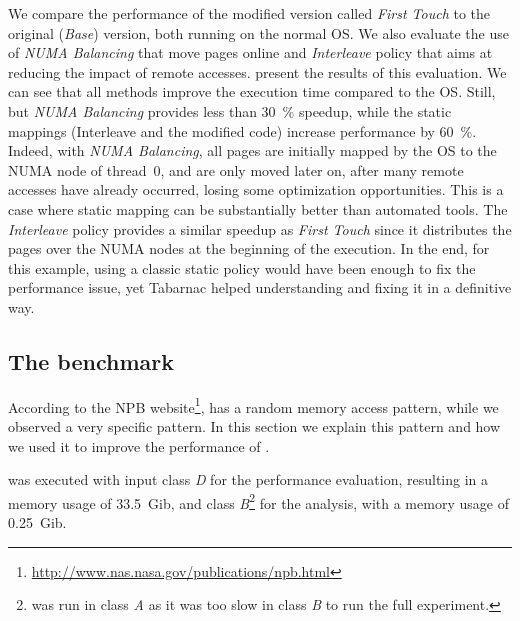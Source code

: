 We compare the performance of the modified version called \emph{First Touch} to the original (\emph{Base}) version, both running on the normal OS.
We also evaluate the use of \emph{NUMA Balancing} that move pages online and \emph{Interleave} policy that aims at reducing the impact of remote accesses.
 present the results of this evaluation.
We can see that all methods improve the execution time compared to the \gls{OS}.
Still, but \emph{NUMA Balancing} provides less than \SI{30}{\%} speedup, while the static mappings (Interleave and the modified code) increase performance by \SI{60}{\%}.
Indeed, with \emph{NUMA Balancing}, all pages are initially mapped by the \gls{OS} to the \gls{NUMA} node of thread~$0$, and are only moved later on, after many remote accesses have already occurred, losing some optimization opportunities.
This is a case where static mapping can be substantially better than automated tools.
The \emph{Interleave} policy provides a similar speedup as \emph{First Touch} since it distributes the pages over the \gls{NUMA} nodes at the beginning of the execution.
In the end, for this example, using a classic static policy would have been enough to fix the performance issue, yet \gls{Tabarnac} helped understanding and fixing it in a definitive way.

\subsection{The \IS benchmark}
\label{sec:tab-is}


According to the \gls{NPB} website\footnote{\url{http://www.nas.nasa.gov/publications/npb.html}}, \IS has a random memory access pattern, while we observed a very specific pattern.
In this section we explain this pattern and how we used it to improve the performance of \IS.

\IS was executed with input class \emph{D} for the performance evaluation, resulting in a memory usage of \SI{33.5}{Gib}, and class \emph{B}\footnote{
    \DC was run in class \emph{A} as it was too slow in class \emph{B} to run the full experiment.}
    for the analysis, with a memory usage of \SI{0.25}{Gib}.

